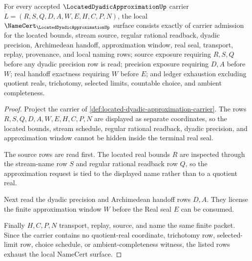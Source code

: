 \begin{theorem}
\label{thm:located-dyadic-approximation-obligations}
For every accepted $\LocatedDyadicApproximationUp$ carrier $L=(R,S,Q,D,A,W,E,H,C,P,N)$, the local $\NameCert_{\LocatedDyadicApproximationUp}$ surface consists exactly of carrier admission for the located bounds, stream source, regular rational readback, dyadic precision, Archimedean handoff, approximation window, real seal, transport, replay, provenance, and local naming rows; source exposure requiring $R,S,Q$ before any dyadic precision row is read; precision exposure requiring $D,A$ before $W$; real handoff exactness requiring $W$ before $E$; and ledger exhaustion excluding quotient reals, trichotomy, selected limits, countable choice, and ambient completeness.
\end{theorem}
\begin{proof}
Project the carrier of \autoref{def:located-dyadic-approximation-carrier}. The rows $R,S,Q,D,A,W,E,H,C,P,N$ are displayed as separate coordinates, so the located bounds, stream schedule, regular rational readback, dyadic precision, and approximation window cannot be hidden inside the terminal real seal.

The source rows are read first. The located real bounds $R$ are inspected through the stream-name row $S$ and regular rational readback row $Q$, so the approximation request is tied to the displayed name rather than to a quotient real.

Next read the dyadic precision and Archimedean handoff rows $D,A$. They license the finite approximation window $W$ before the Real seal $E$ can be consumed.

Finally $H,C,P,N$ transport, replay, source, and name the same finite packet. Since the carrier contains no quotient-real coordinate, trichotomy row, selected-limit row, choice schedule, or ambient-completeness witness, the listed rows exhaust the local NameCert surface.
\end{proof}

